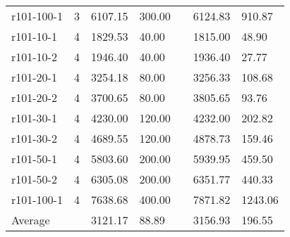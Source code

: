 \documentclass[final,5p,times,twocolumn]{elsarticle}
\begin{document}
{{{{{{{{{{\begin{table}[htbp]
\begin{tabular}{l l l l l l l}
r101-100-1&3&6107.15&300.00&&6124.83&910.87\\
r101-10-1&4&1829.53&40.00&&1815.00&48.90\\
r101-10-2&4&1946.40&40.00&&1936.40&27.77\\
r101-20-1&4&3254.18&80.00&&3256.33&108.68\\
r101-20-2&4&3700.65&80.00&&3805.65&93.76\\
r101-30-1&4&4230.00&120.00&&4232.00&202.82\\
r101-30-2&4&4689.55&120.00&&4878.73&159.46\\
r101-50-1&4&5803.60&200.00&&5939.95&459.50\\
r101-50-2&4&6305.08&200.00&&6351.77&440.33\\
r101-100-1&4&7638.68&400.00&&7871.82&1243.06\\
\hline
Average&&3121.17&88.89&&3156.93&196.55\\
\hline
\end{tabular}
\label{tab:pt300_5}
\end{table}

}}}}}}}}}}
\end{document}
